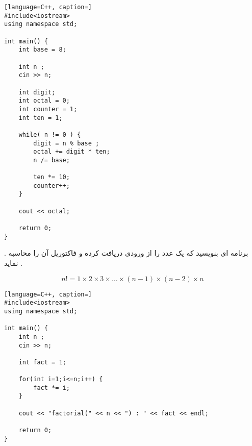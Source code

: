 \documentclass[12pt]{article}
\begin{document}
\begin{latin}
\begin{lstlisting}[language=C++, caption=]
#include<iostream>
using namespace std;

int main() {
	int base = 8;
	
	int n ;
	cin >> n;
	
	int digit;
	int octal = 0;
	int counter = 1;
	int ten = 1;
	
	while( n != 0 ) {
		digit = n % base ;
		octal += digit * ten;
		n /= base;
		
		ten *= 10;
		counter++;
	}
	
	cout << octal;
	
	return 0;
}
\end{lstlisting}
\end{latin}







\newpage

 . برنامه ای بنویسید که یک عدد را از ورودی دریافت کرده و فاکتوریل آن را محاسبه نماید .

\begin{tcolorbox}
$$
n ! = 1 \times 2 \times 3 \times \dots \times (n-1) \times (n-2) \times n
$$
\end{tcolorbox}







\begin{latin}
\begin{lstlisting}[language=C++, caption=]
#include<iostream>
using namespace std;

int main() {
	int n ;
	cin >> n;
	
	int fact = 1;
	
	for(int i=1;i<=n;i++) {
		fact *= i;
	}
	
	cout << "factorial(" << n << ") : " << fact << endl;  
	
	return 0;
}
\end{lstlisting}
\end{latin}
\end{document}
